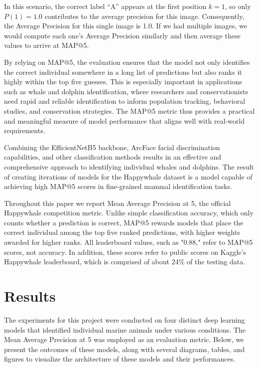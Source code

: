 \documentclass[twocolumn]{article}
\begin{document}
In this scenario, the correct label “A” appears at the first position \( k=1 \), so only \( P(1) = 1.0 \) contributes to the average precision for this image. Consequently, the Average Precision for this single image is 1.0. If we had multiple images, we would compute each one’s Average Precision similarly and then average these values to arrive at MAP@5.

By relying on MAP@5, the evaluation ensures that the model not only identifies the correct individual somewhere in a long list of predictions but also ranks it highly within the top five guesses. This is especially important in applications such as whale and dolphin identification, where researchers and conservationists need rapid and reliable identification to inform population tracking, behavioral studies, and conservation strategies. The MAP@5 metric thus provides a practical and meaningful measure of model performance that aligns well with real-world requirements.

Combining the EfficientNetB5 backbone, ArcFace facial discrimination capabilities, and other classification methods results in an effective and comprehensive approach to identifying individual whales and dolphins. The result of creating iterations of models for the Happywhale dataset is a model capable of achieving high MAP@5 scores in fine-grained mammal identification tasks.

Throughout this paper we report Mean Average Precision at 5, the official Happywhale competition metric. Unlike simple classification accuracy, which only counts whether a prediction is correct, MAP@5 rewards models that place the correct individual among the top five ranked predictions, with higher weights awarded for higher ranks. All leaderboard values, such as "0.88," refer to MAP@5 scores, not accuracy. In addition, these scores refer to public scores on Kaggle's Happywhale leaderboard, which is comprised of about 24\% of the testing data.

\section{Results}

The experiments for this project were conducted on four distinct deep learning models that identified individual marine animals under various conditions. The Mean Average Precision at 5 was employed as an evaluation metric. Below, we present the outcomes of these models, along with several diagrams, tables, and figures to visualize the architecture of these models and their performances.
\end{document}
